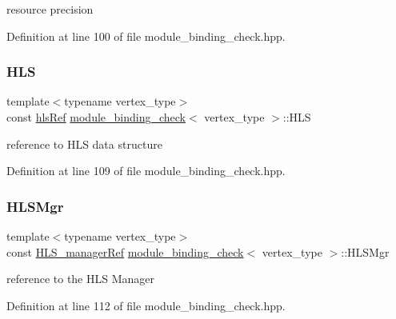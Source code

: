 resource precision 



Definition at line 100 of file module\+\_\+binding\+\_\+check.\+hpp.

\mbox{\label{structmodule__binding__check_a7f6156fe38737e4e19bdc9638c9a0395}} 
\subsubsection{\texorpdfstring{H\+LS}{HLS}}
{\footnotesize\ttfamily template$<$typename vertex\+\_\+type$>$ \\
const \hyperlink{hls_8hpp_a75d0c73923d0ddfa28c4843a802c73a7}{hls\+Ref} \hyperlink{structmodule__binding__check}{module\+\_\+binding\+\_\+check}$<$ vertex\+\_\+type $>$\+::H\+LS\hspace{0.3cm}{\ttfamily [private]}}



reference to H\+LS data structure 



Definition at line 109 of file module\+\_\+binding\+\_\+check.\+hpp.

\mbox{\label{structmodule__binding__check_a71ccc2df21dfba5d88bd55b83d45d3bf}} 
\subsubsection{\texorpdfstring{H\+L\+S\+Mgr}{HLSMgr}}
{\footnotesize\ttfamily template$<$typename vertex\+\_\+type$>$ \\
const \hyperlink{hls__manager_8hpp_acd3842b8589fe52c08fc0b2fcc813bfe}{H\+L\+S\+\_\+manager\+Ref} \hyperlink{structmodule__binding__check}{module\+\_\+binding\+\_\+check}$<$ vertex\+\_\+type $>$\+::H\+L\+S\+Mgr\hspace{0.3cm}{\ttfamily [private]}}



reference to the H\+LS Manager 



Definition at line 112 of file module\+\_\+binding\+\_\+check.\+hpp.

